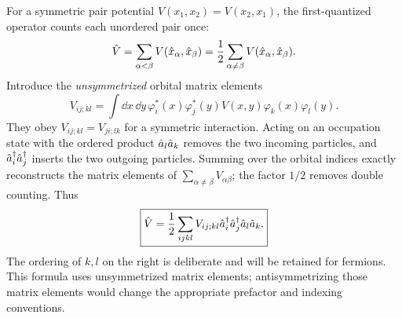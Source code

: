 For a symmetric pair potential $V(x_1,x_2)=V(x_2,x_1)$, the first-quantized operator counts each unordered pair once:
\begin{equation}
\hat{V}=\sum_{\alpha<\beta}V(\hat{x}_\alpha,\hat{x}_\beta)
 =\frac12\sum_{\alpha\ne\beta}V(\hat{x}_\alpha,\hat{x}_\beta).
\end{equation}
Introduce the \emph{unsymmetrized} orbital matrix elements
\begin{equation}
V_{ij;kl}=\int\dd x\,\dd y\,
  \varphi_i^*(x)\varphi_j^*(y)V(x,y)\varphi_k(x)\varphi_l(y).
\end{equation}
They obey $V_{ij;kl}=V_{ji;lk}$ for a symmetric interaction. Acting on an occupation state with the ordered product $\hat{a}_l\hat{a}_k$ removes the two incoming particles, and $\hat{a}_i^\dagger\hat{a}_j^\dagger$ inserts the two outgoing particles. Summing over the orbital indices exactly reconstructs the matrix elements of $\sum_{\alpha\ne\beta}V_{\alpha\beta}$; the factor $1/2$ removes double counting. Thus
\begin{equation}
\boxed{\hat{V}=\frac12\sum_{ijkl}V_{ij;kl}
\hat{a}_i^\dagger\hat{a}_j^\dagger\hat{a}_l\hat{a}_k.}
\end{equation}
The ordering of $k,l$ on the right is deliberate and will be retained for fermions. This formula uses unsymmetrized matrix elements; antisymmetrizing those matrix elements would change the appropriate prefactor and indexing conventions.

